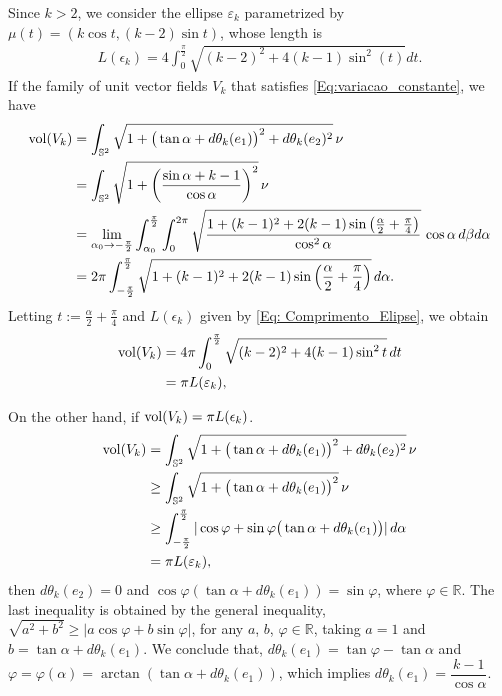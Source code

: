 \documentclass[reqno,11pt]{amsart}
\DeclareMathOperator{\vol}{\rm vol}
\begin{document}
\noindent Since  $k > 2$, we consider the ellipse $\varepsilon_{k}$ parametrized by
$\mu(t) = (k \cos t, (k-2)\sin t)$, whose length is
\begin{eqnarray}\label{Eq: Comprimento_Elipse}
    L(\epsilon_k) = 4\int_{0}^{\frac{\pi}{2}}\sqrt{ (k-2)^2 + 4(k-1)\sin^2 (t)} dt.
\end{eqnarray}
If the family of unit vector fields $V_k$ that satisfies \eqref{Eq:variacao_constante}, we have
\begin{align*}
\vol(V_k) 
    & =  \int_{\mathbb{S}^2} \sqrt{1+  \big( \tan \alpha + d\theta_k(e_1)\big)^2 + d\theta_k(e_2)^2}\, \nu\\
    & = \int_{\mathbb{S}^2}{\sqrt{1+ \left( \frac{\sin \alpha + k-1}{\cos\alpha}\right)^2}}\,\nu \\
    & =  \lim_{\alpha_0 \to -\frac{\pi}{2}} \int_{\alpha_0}^{\frac{\pi}{2}}\int_{0}^{2\pi}{\sqrt{ \frac{1+ (k-1)^2 +2(k-1)\sin\left(\frac{\alpha}{2} + \frac{\pi}{4}\right)}{\cos^2\alpha}}}\,\cos\alpha \,d\beta d\alpha \\
    & =  2\pi\int_{-\frac{\pi}{2}}^{\frac{\pi}{2}}\sqrt{1+ (k-1)^2 +2(k-1)\sin \left(\frac{\alpha}{2} + \frac{\pi}{4}\right)}\, d\alpha.
\end{align*}
Letting $t := \frac{\alpha}{2} + \frac{\pi}{4}$ and $L(\epsilon_k)$ given by \eqref{Eq: Comprimento_Elipse}, we obtain
\begin{align*}
\vol(V_k)  & = 4\pi\int_{0}^{\frac{\pi}{2}}\sqrt{(k-2)^2 + 4(k-1)\sin^2t}\,dt \\ 
                 & = \pi L(\varepsilon_k),
\end{align*}

\noindent On the other hand, if $\vol(V_k ) = \pi L(\epsilon_k)$.
\begin{align*}
\vol(V_k) & = \int_{\mathbb{S}^2} \sqrt{1+  \big( \tan \alpha + d\theta_k(e_1)\big)^2 + d\theta_k(e_2)^2}\, \nu\\
    & \geq \int_{\mathbb{S}^2} \sqrt{1+  \big( \tan \alpha + d\theta_k(e_1)\big)^2}\, \nu\\
    & \geq \int_{-\frac{\pi}{2}}^{\frac{\pi}{2}}{|\cos \varphi + \sin\varphi \big( \tan \alpha + d\theta_k(e_1)\big)|}\, d\alpha \\
    & = \pi L(\varepsilon_k),
\end{align*}
then $d\theta_k(e_2) = 0$ and $\cos\varphi(\tan \alpha + d\theta_k(e_1)) = \sin\varphi$, where $\varphi \in \mathbb{R}$. The last inequality is obtained by the general inequality, $\sqrt{a^2 + b^2} \geq |a\cos \varphi + b \sin \varphi|$, for any $a$, $b$, $\varphi \in \mathbb{R}$, taking $a=1$ and $b=\tan \alpha + d\theta_k(e_1)$. We conclude that, $d\theta_k(e_1) =  \tan\varphi - \tan\alpha$ and $\varphi = \varphi(\alpha) = \arctan\left(\tan \alpha + d \theta_k(e_1)\right)$, which implies $d\theta_k(e_1)= \dfrac{k-1}{\cos \alpha}$.
\end{document}
